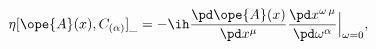 \begin{equation}	\label{5.3}
\eta [\ope{A}(x) , C_{(\alpha)}]_{\_}
=
- \ih \frac{\pd\ope{A}(x)}{\pd x^\mu}
    \frac{\pd x^{\omega\,\mu}}{\pd \omega^\alpha}\Big|_{\omega=0} ,
	\end{equation}

